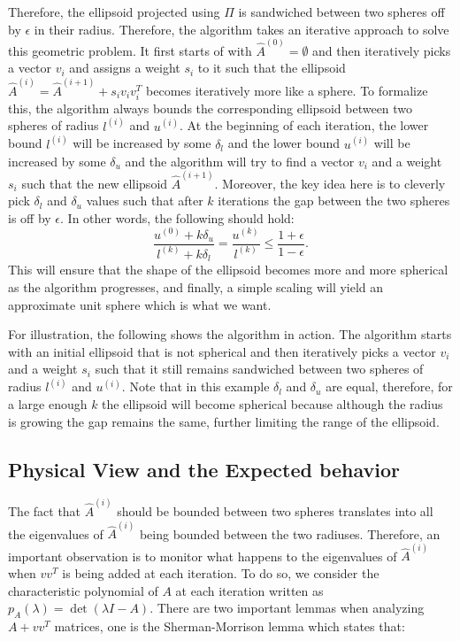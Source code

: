 \documentclass[
  letterpaper,
  DIV=11,
  numbers=noendperiod]{scrartcl}
\theoremstyle{plain}
\theoremstyle{plain}
\theoremstyle{plain}
\theoremstyle{definition}
\theoremstyle{remark}
\begin{document}
Therefore, the ellipsoid projected using \(\Pi\) is sandwiched between
two spheres off by \(\epsilon\) in their radius. Therefore, the
algorithm takes an iterative approach to solve this geometric problem.
It first starts of with \(\hat{A}^{(0)} = \emptyset\) and then
iteratively picks a vector \(v_i\) and assigns a weight \(s_i\) to it
such that the ellipsoid
\(\hat{A}^{(i)} = \hat{A}^{(i+1)} + s_i v_i v_i^T\) becomes iteratively
more like a sphere. To formalize this, the algorithm always bounds the
corresponding ellipsoid between two spheres of radius \(l^{(i)}\) and
\(u^{(i)}\). At the beginning of each iteration, the lower bound
\(l^{(i)}\) will be increased by some \(\delta_l\) and the lower bound
\(u^{(i)}\) will be increased by some \(\delta_u\) and the algorithm
will try to find a vector \(v_i\) and a weight \(s_i\) such that the new
ellipsoid \(\hat{A}^{(i+1)}\). Moreover, the key idea here is to
cleverly pick \(\delta_l\) and \(\delta_u\) values such that after \(k\)
iterations the gap between the two spheres is off by \(\epsilon\). In
other words, the following should hold:
\[\frac{u^{(0)} + k \delta_u}{l^{(k)} + k \delta_l} = \frac{u^{(k)}}{l^{(k)}} \le \frac{1 + \epsilon}{1 - \epsilon}.\]
This will ensure that the shape of the ellipsoid becomes more and more
spherical as the algorithm progresses, and finally, a simple scaling
will yield an approximate unit sphere which is what we want.

For illustration, the following shows the algorithm in action. The
algorithm starts with an initial ellipsoid that is not spherical and
then iteratively picks a vector \(v_i\) and a weight \(s_i\) such that
it still remains sandwiched between two spheres of radius \(l^{(i)}\)
and \(u^{(i)}\). Note that in this example \(\delta_l\) and \(\delta_u\)
are equal, therefore, for a large enough \(k\) the ellipsoid will become
spherical because although the radius is growing the gap remains the
same, further limiting the range of the ellipsoid.

\hypertarget{physical-view-and-the-expected-behavior}{%
\subsection{Physical View and the Expected
behavior}\label{physical-view-and-the-expected-behavior}}

The fact that \(\hat{A}^{(i)}\) should be bounded between two spheres
translates into all the eigenvalues of \(\hat{A}^{(i)}\) being bounded
between the two radiuses. Therefore, an important observation is to
monitor what happens to the eigenvalues of \(\hat{A}^{(i)}\) when
\(vv^T\) is being added at each iteration. To do so, we consider the
characteristic polynomial of \(A\) at each iteration written as
\(p_A(\lambda) = \det(\lambda I - A)\). There are two important lemmas
when analyzing \(A + vv^T\) matrices, one is the Sherman-Morrison lemma
which states that:
\end{document}
